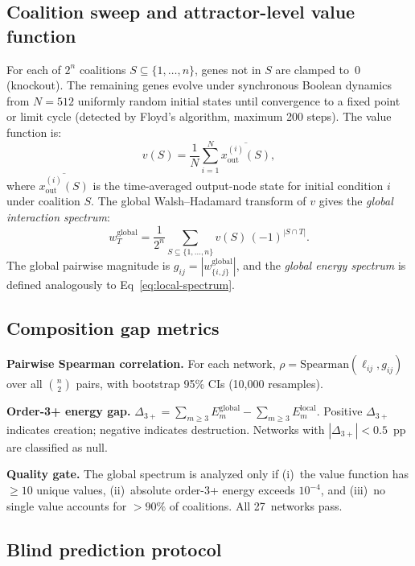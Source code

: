 \documentclass[10pt,letterpaper]{article}
\begin{document}
\subsection*{Coalition sweep and attractor-level value function}
\label{sec:coalition-sweep}

For each of $2^n$ coalitions $S \subseteq \{1,\ldots,n\}$, genes not
in $S$ are clamped to~0 (knockout). The remaining genes evolve under
synchronous Boolean dynamics from $N = 512$ uniformly random initial
states until convergence to a fixed point or limit cycle (detected by
Floyd's algorithm, maximum 200 steps). The value function is:
%
\begin{equation}
\label{eq:value}
v(S) = \frac{1}{N} \sum_{i=1}^{N}
\overline{x_{\mathrm{out}}^{(i)}(S)},
\end{equation}
%
where $\overline{x_{\mathrm{out}}^{(i)}(S)}$ is the time-averaged
output-node state for initial condition $i$ under coalition $S$. The
global Walsh--Hadamard transform of $v$ gives the \emph{global
interaction spectrum}:
%
\begin{equation}
\label{eq:global-wht}
w_T^{\mathrm{global}} = \frac{1}{2^n} \sum_{S \subseteq \{1,\ldots,n\}}
v(S)\,(-1)^{|S \cap T|}.
\end{equation}
%
The global pairwise magnitude is
$g_{ij} = |w_{\{i,j\}}^{\mathrm{global}}|$, and the
\emph{global energy spectrum} is defined analogously to
Eq~\ref{eq:local-spectrum}.


\subsection*{Composition gap metrics}
\label{sec:metrics}

\textbf{Pairwise Spearman correlation.}
For each network, $\rho = \mathrm{Spearman}(\ell_{ij}, g_{ij})$ over
all $\binom{n}{2}$ pairs, with bootstrap 95\% CIs (10{,}000
resamples).

\textbf{Order-3+ energy gap.}
$\Delta_{3+} = \sum_{m \geq 3} E_m^{\mathrm{global}}
- \sum_{m \geq 3} E_m^{\mathrm{local}}.$
Positive $\Delta_{3+}$ indicates creation; negative indicates
destruction. Networks with $|\Delta_{3+}| < 0.5$~pp are classified as
null.

\textbf{Quality gate.}
The global spectrum is analyzed only if (i)~the value function has
$\geq 10$ unique values, (ii)~absolute order-3+ energy exceeds
$10^{-4}$, and (iii)~no single value accounts for $> 90\%$ of
coalitions. All 27~networks pass.


\subsection*{Blind prediction protocol}
\label{sec:blind}
\end{document}
